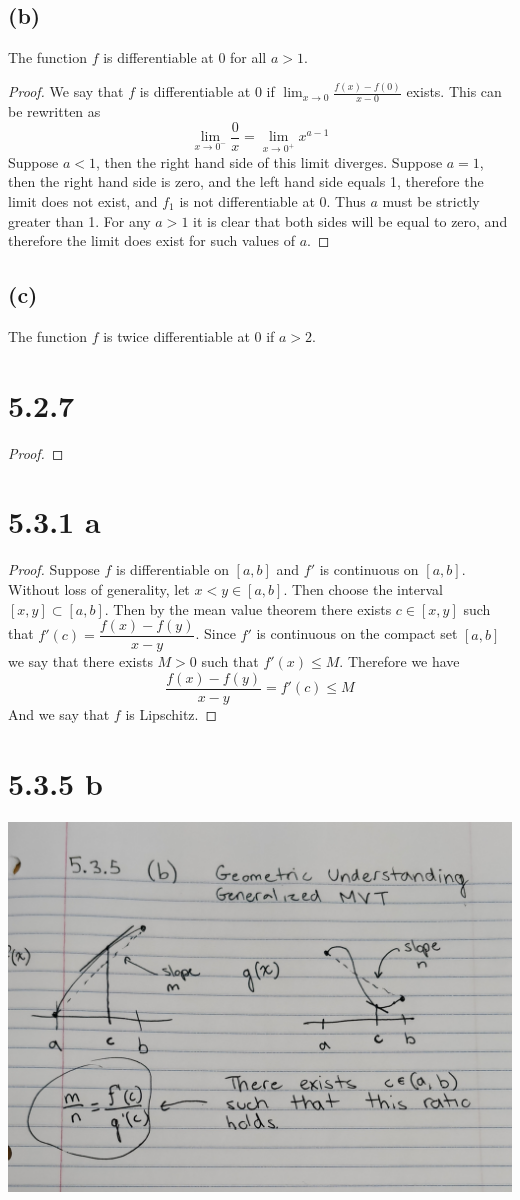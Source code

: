 \documentclass{article}
\begin{document}
\subsection*{(b)}
The function $f$ is differentiable at 0 for all $a >1$.
\begin{proof}
We say that $f$ is differentiable at 0 if $\lim_{x \rightarrow 0} \frac{f(x) - f(0)}{x - 0}$ exists. This can be rewritten as
\[  \lim_{x \rightarrow 0^-}\frac{0}{x}= \lim_{x \rightarrow 0^+} x^{a-1} \]
Suppose $a < 1$, then the right hand side of this limit diverges. Suppose $a = 1$, then the right hand side is zero, and the left hand side equals 1, therefore the limit does not exist, and $f_1$ is not differentiable at 0. Thus $a$ must be strictly greater than 1. For any $a > 1$ it is clear that both sides will be equal to zero, and therefore the limit does exist for such values of $a$.
\end{proof}

\subsection*{(c)}
The function $f$ is twice differentiable at 0 if $a>2$.

\section*{5.2.7}
\begin{proof}

\end{proof}

\section*{5.3.1 a}
\begin{proof}
Suppose $f$ is differentiable on $[a,b]$ and $f'$ is continuous on $[a,b]$. Without loss of generality, let $x < y \in [a,b]$. Then choose the interval $[x,y] \subset [a,b]$. Then by the mean value theorem there exists $c \in [x,y]$ such that $f'(c) = \dfrac{f(x)-f(y)}{x-y}$. Since $f'$ is continuous on the compact set $[a,b]$ we say that there exists $M>0$ such that $f'(x) \leqslant M$. Therefore we have
\[ \frac{f(x) - f(y)}{x-y} = f'(c) \leqslant M \]
And we say that $f$ is Lipschitz.
\end{proof}

\section*{5.3.5 b}
\includegraphics[scale=0.1]{pic.jpg}
\end{document}

